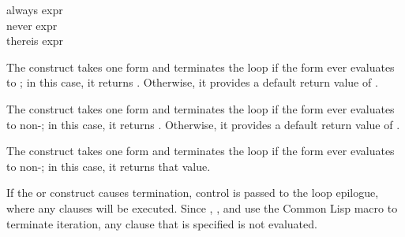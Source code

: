 \begin{defloop}
always expr \\
never expr \\
thereis expr

The  construct takes one form and terminates the loop if
the form ever evaluates to ; in this case, it returns
.  Otherwise, it provides a default return value of .

The  construct takes one form and terminates the loop if
the form ever evaluates to non-; in this case, it returns
.  Otherwise, it provides a default return value of .

The  construct takes one form and terminates the loop if
the form ever evaluates to non-; in this case, it returns
that value.

If the  or  construct causes termination,
control is passed to the loop epilogue, where any 
clauses will be executed.  Since , , and 
 use the Common Lisp macro  to terminate
iteration, any  clause that is specified is not
evaluated.


\end{defloop}
